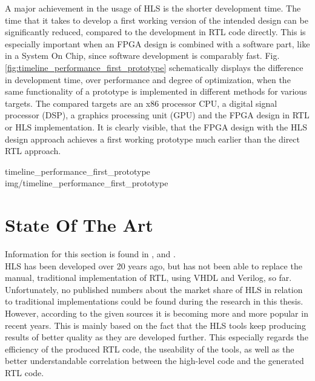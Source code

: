 A major achievement in the usage of HLS is the shorter development time.
The time that it takes to develop a first working version of the intended design can be significantly reduced, compared to the development in RTL code directly.
This is especially important when an FPGA design is combined with a software part, like in a System On Chip, since software development is comparably fast.
Fig.\ref{fig:timeline_performance_first_prototype} schematically displays the difference in development time, over performance and degree of optimization, when the same functionality of a prototype is implemented in different methods for various targets.
The compared targets are an x86 processor CPU, a digital signal processor (DSP), a graphics processing unit (GPU) and the FPGA design in RTL or HLS implementation.
It is clearly visible, that the FPGA design with the HLS design approach achieves a first working prototype much earlier than the direct RTL approach.

 {timeline_performance_first_prototype} {img/timeline_performance_first_prototype}


\section{State Of The Art}

Information for this section is found in \cite{EvolutionOfHLS}, \cite{XilinxVivisHLSOpenSource} and \cite{CompareHlsVHDLArticle}.\\

HLS has been developed over 20 years ago, but has not been able to replace the manual, traditional implementation of RTL, using VHDL and Verilog, so far.
Unfortunately, no published numbers about the market share of HLS in relation to traditional implementations could be found during the research in this thesis.
However, according to the given sources it is becoming more and more popular in recent years.
This is mainly based on the fact that the HLS tools keep producing results of better quality as they are developed further.
This especially regards the efficiency of the produced RTL code, the useability of the tools, as well as the better understandable correlation between the high-level code and the generated RTL code.\\


